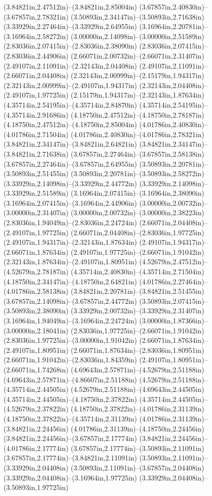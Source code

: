 (3.84821in,2.47512in)--(3.84821in,2.85004in) (3.67857in,2.40830in)--(3.67857in,2.78321in) (3.50893in,2.34147in)--(3.50893in,2.71638in) (3.33929in,2.27464in)--(3.33929in,2.64955in) (3.16964in,2.20781in)--(3.16964in,2.58272in) (3.00000in,2.14098in)--(3.00000in,2.51589in) (2.83036in,2.07415in)--(2.83036in,2.38090in) (2.83036in,2.07415in)--(2.83036in,2.44906in) (2.66071in,2.00732in)--(2.66071in,2.31407in) (2.49107in,2.11091in)--(2.32143in,2.04408in) (2.49107in,2.11091in)--(2.66071in,2.04408in) (2.32143in,2.00999in)--(2.15179in,1.94317in) (2.32143in,2.00999in)--(2.49107in,1.94317in) (2.32143in,2.04408in)--(2.49107in,1.97725in) (2.15179in,1.94317in)--(2.32143in,1.87634in) (4.35714in,2.54195in)--(4.35714in,2.84870in) (4.35714in,2.54195in)--(4.35714in,2.91686in) (4.18750in,2.47512in)--(4.18750in,2.78187in) (4.18750in,2.47512in)--(4.18750in,2.85004in) (4.01786in,2.40830in)--(4.01786in,2.71504in) (4.01786in,2.40830in)--(4.01786in,2.78321in) (3.84821in,2.34147in)--(3.84821in,2.64821in) (3.84821in,2.34147in)--(3.84821in,2.71638in) (3.67857in,2.27464in)--(3.67857in,2.58138in) (3.67857in,2.27464in)--(3.67857in,2.64955in) (3.50893in,2.20781in)--(3.50893in,2.51455in) (3.50893in,2.20781in)--(3.50893in,2.58272in) (3.33929in,2.14098in)--(3.33929in,2.44772in) (3.33929in,2.14098in)--(3.33929in,2.51589in) (3.16964in,2.07415in)--(3.16964in,2.38090in) (3.16964in,2.07415in)--(3.16964in,2.44906in) (3.00000in,2.00732in)--(3.00000in,2.31407in) (3.00000in,2.00732in)--(3.00000in,2.38223in) (2.83036in,1.94049in)--(2.83036in,2.24724in) (2.66071in,2.04408in)--(2.49107in,1.97725in) (2.66071in,2.04408in)--(2.83036in,1.97725in) (2.49107in,1.94317in)--(2.32143in,1.87634in) (2.49107in,1.94317in)--(2.66071in,1.87634in) (2.49107in,1.97725in)--(2.66071in,1.91042in) (2.32143in,1.87634in)--(2.49107in,1.80951in) (4.52679in,2.47512in)--(4.52679in,2.78187in) (4.35714in,2.40830in)--(4.35714in,2.71504in) (4.18750in,2.34147in)--(4.18750in,2.64821in) (4.01786in,2.27464in)--(4.01786in,2.58138in) (3.84821in,2.20781in)--(3.84821in,2.51455in) (3.67857in,2.14098in)--(3.67857in,2.44772in) (3.50893in,2.07415in)--(3.50893in,2.38090in) (3.33929in,2.00732in)--(3.33929in,2.31407in) (3.16964in,1.94049in)--(3.16964in,2.24724in) (3.00000in,1.87366in)--(3.00000in,2.18041in) (2.83036in,1.97725in)--(2.66071in,1.91042in) (2.83036in,1.97725in)--(3.00000in,1.91042in) (2.66071in,1.87634in)--(2.49107in,1.80951in) (2.66071in,1.87634in)--(2.83036in,1.80951in) (2.66071in,1.91042in)--(2.83036in,1.84359in) (2.49107in,1.80951in)--(2.66071in,1.74268in) (4.69643in,2.57871in)--(4.52679in,2.51188in) (4.69643in,2.57871in)--(4.86607in,2.51188in) (4.52679in,2.51188in)--(4.35714in,2.44505in) (4.52679in,2.51188in)--(4.69643in,2.44505in) (4.35714in,2.44505in)--(4.18750in,2.37822in) (4.35714in,2.44505in)--(4.52679in,2.37822in) (4.18750in,2.37822in)--(4.01786in,2.31139in) (4.18750in,2.37822in)--(4.35714in,2.31139in) (4.01786in,2.31139in)--(3.84821in,2.24456in) (4.01786in,2.31139in)--(4.18750in,2.24456in) (3.84821in,2.24456in)--(3.67857in,2.17774in) (3.84821in,2.24456in)--(4.01786in,2.17774in) (3.67857in,2.17774in)--(3.50893in,2.11091in) (3.67857in,2.17774in)--(3.84821in,2.11091in) (3.50893in,2.11091in)--(3.33929in,2.04408in) (3.50893in,2.11091in)--(3.67857in,2.04408in) (3.33929in,2.04408in)--(3.16964in,1.97725in) (3.33929in,2.04408in)--(3.50893in,1.97725in) 